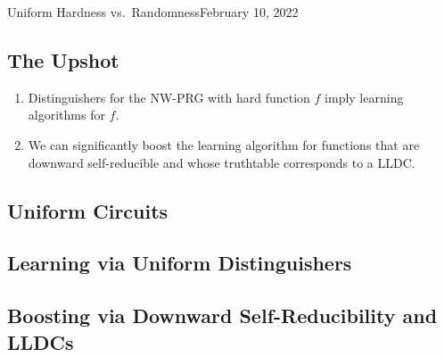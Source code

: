 \begin{lecture}{4}{Uniform Hardness vs.\ Randomness}{February 10, 2022}

\subsection*{The Upshot}

\begin{enumerate}
  \item Distinguishers for the NW-PRG with hard function $f$ imply learning
    algorithms for $f$.
  \item We can significantly boost the learning algorithm for functions that
    are downward self-reducible and whose truthtable corresponds to a LLDC.
\end{enumerate}


\subsection{Uniform Circuits}

\subsection{Learning via Uniform Distinguishers}

\subsection{Boosting via Downward Self-Reducibility and LLDCs}

\end{lecture}
